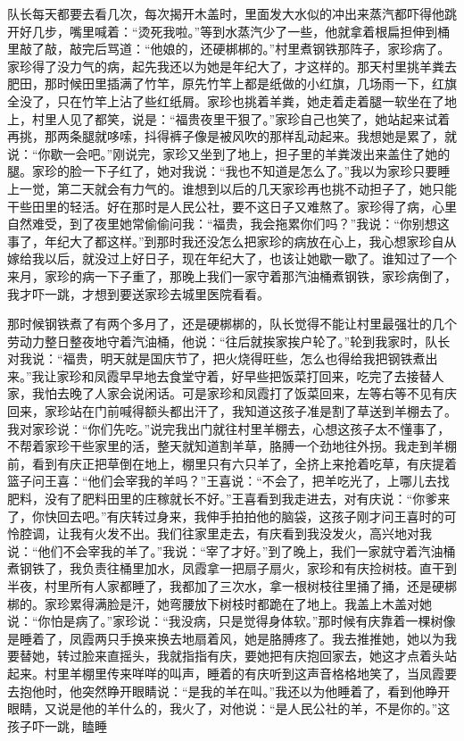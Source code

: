 \documentclass[12pt,UTF8]{ctexbook}
\begin{document}
队长每天都要去看几次，每次揭开木盖时，里面发大水似的冲出来蒸汽都吓得他跳开好几步，嘴里喊着：“烫死我啦。”等到水蒸汽少了一些，他就拿着根扁担伸到桶里敲了敲，敲完后骂道：“他娘的，还硬梆梆的。”村里煮钢铁那阵子，家珍病了。家珍得了没力气的病，起先我还以为她是年纪大了，才这样的。那天村里挑羊粪去肥田，那时候田里插满了竹竿，原先竹竿上都是纸做的小红旗，几场雨一下，红旗全没了，只在竹竿上沾了些红纸屑。家珍也挑着羊粪，她走着走着腿一软坐在了地上，村里人见了都笑，说是：“福贵夜里干狠了。”家珍自己也笑了，她站起来试着再挑，那两条腿就哆嗦，抖得裤子像是被风吹的那样乱动起来。我想她是累了，就说：“你歇一会吧。”刚说完，家珍又坐到了地上，担子里的羊粪泼出来盖住了她的腿。家珍的脸一下子红了，她对我说：“我也不知道是怎么了。”我以为家珍只要睡上一觉，第二天就会有力气的。谁想到以后的几天家珍再也挑不动担子了，她只能干些田里的轻活。好在那时是人民公社，要不这日子又难熬了。家珍得了病，心里自然难受，到了夜里她常偷偷问我：“福贵，我会拖累你们吗？”我说：“你别想这事了，年纪大了都这样。”到那时我还没怎么把家珍的病放在心上，我心想家珍自从嫁给我以后，就没过上好日子，现在年纪大了，也该让她歇一歇了。谁知过了一个来月，家珍的病一下子重了，那晚上我们一家守着那汽油桶煮钢铁，家珍病倒了，我才吓一跳，才想到要送家珍去城里医院看看。

那时候钢铁煮了有两个多月了，还是硬梆梆的，队长觉得不能让村里最强壮的几个劳动力整日整夜地守着汽油桶，他说：“往后就挨家挨户轮了。”轮到我家时，队长对我说：“福贵，明天就是国庆节了，把火烧得旺些，怎么也得给我把钢铁煮出来。”我让家珍和凤霞早早地去食堂守着，好早些把饭菜打回来，吃完了去接替人家，我怕去晚了人家会说闲话。可是家珍和凤霞打了饭菜回来，左等右等不见有庆回来，家珍站在门前喊得额头都出汗了，我知道这孩子准是割了草送到羊棚去了。我对家珍说：“你们先吃。”说完我出门就往村里羊棚去，心想这孩子太不懂事了，不帮着家珍干些家里的活，整天就知道割羊草，胳膊一个劲地往外拐。我走到羊棚前，看到有庆正把草倒在地上，棚里只有六只羊了，全挤上来抢着吃草，有庆提着篮子问王喜：“他们会宰我的羊吗？”王喜说：“不会了，把羊吃光了，上哪儿去找肥料，没有了肥料田里的庄稼就长不好。”王喜看到我走进去，对有庆说：“你爹来了，你快回去吧。”有庆转过身来，我伸手拍拍他的脑袋，这孩子刚才问王喜时的可怜腔调，让我有火发不出。我们往家里走去，有庆看到我没发火，高兴地对我说：“他们不会宰我的羊了。”我说：“宰了才好。”到了晚上，我们一家就守着汽油桶煮钢铁了，我负责往桶里加水，凤霞拿一把扇子扇火，家珍和有庆捡树枝。直干到半夜，村里所有人家都睡了，我都加了三次水，拿一根树枝往里捅了捅，还是硬梆梆的。家珍累得满脸是汗，她弯腰放下树枝时都跪在了地上。我盖上木盖对她说：“你怕是病了。”家珍说：“我没病，只是觉得身体软。”那时候有庆靠着一棵树像是睡着了，凤霞两只手换来换去地扇着风，她是胳膊疼了。我去推推她，她以为我要替她，转过脸来直摇头，我就指指有庆，要她把有庆抱回家去，她这才点着头站起来。村里羊棚里传来咩咩的叫声，睡着的有庆听到这声音格格地笑了，当凤霞要去抱他时，他突然睁开眼睛说：“是我的羊在叫。”我还以为他睡着了，看到他睁开眼睛，又说是他的羊什么的，我火了，对他说：“是人民公社的羊，不是你的。”这孩子吓一跳，瞌睡
\end{document}
